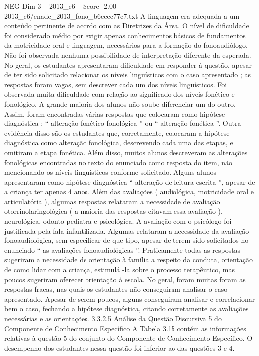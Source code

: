 \begin{textsample}{NEG Dim 3 – 2013\_c6 – Score -2.00 – 2013\_c6/enade\_2013\_fono\_b6ccec77c7.txt}
A linguagem era adequada a um conteúdo pertinente de acordo com as Diretrizes da Área.
O nível de dificuldade foi considerado médio por exigir apenas conhecimentos básicos de fundamentos da motricidade oral e linguagem, necessários para a formação do fonoaudiólogo.
Não foi observada nenhuma possibilidade de interpretação diferente da esperada.
No geral, os estudantes apresentaram dificuldade em responder à questão, apesar de ter sido solicitado relacionar os níveis linguísticos com o caso apresentado ; as respostas foram vagas, sem descrever cada um dos níveis linguísticos.
Foi observada muita dificuldade com relação ao significado dos níveis fonético e fonológico.
A grande maioria dos alunos não soube diferenciar um do outro.
Assim, foram encontradas várias respostas que colocaram como hipótese diagnóstica : “ alteração fonético-fonológica ” ou “ alteração fonética ”.
Outra evidência disso são os estudantes que, corretamente, colocaram a hipótese diagnóstica como alteração fonológica, descrevendo cada uma das etapas, e omitiram a etapa fonética.
Além disso, muitos alunos descreveram as alterações fonológicas encontradas no texto do enunciado como resposta do item, não mencionando os níveis linguísticos conforme solicitado.
Alguns alunos apresentaram como hipótese diagnóstica “ alteração de leitura escrita ”, apesar de a criança ter apenas 4 anos.
Além das avaliações ( audiológica, motricidade oral e articulatória ), algumas respostas relataram a necessidade de avaliação otorrinolaringológica ( a maioria das respostas citavam essa avaliação ), neurológica, odonto-pediatra e psicológica.
A avaliação com o psicólogo foi justificada pela fala infantilizada.
Algumas relataram a necessidade da avaliação fonoaudiológica, sem especificar de que tipo, apesar de terem sido solicitados no enunciado “ as avaliações fonoaudiológicas ”.
Praticamente todas as respostas sugeriram a necessidade de orientação à família a respeito da conduta, orientação de como lidar com a criança, estimulá -la sobre o processo terapêutico, mas poucos sugeriram oferecer orientação à escola.
No geral, foram muitas foram as respostas fracas, nas quais os estudantes não conseguiram analisar o caso apresentado.
Apesar de serem poucos, alguns conseguiram analisar e correlacionar bem o caso, fechando a hipótese diagnóstica, citando corretamente as avaliações necessárias e as orientações. 3.3.2.5 Análise da Questão Discursiva 5 do Componente de Conhecimento Específico A Tabela 3.15 contém as informações relativas à questão 5 do conjunto do Componente de Conhecimento Específico.
O desempenho dos estudantes nessa questão foi inferior ao das questões 3 e 4.

\end{textsample}
